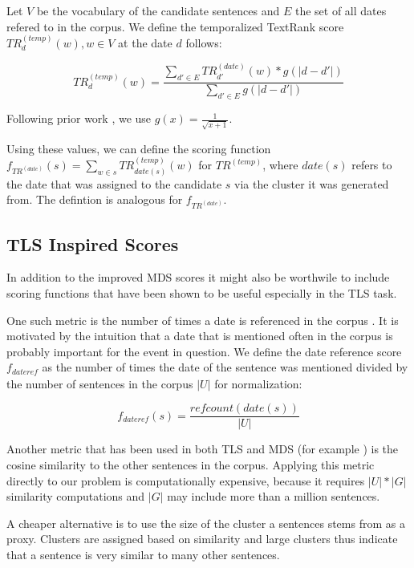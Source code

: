 \documentclass[a4paper,BCOR=10mm]{report}
\numberwithin{lemma}{chapter}
\numberwithin{definition}{chapter}
\begin{document}
Let $V$ be the vocabulary of the candidate sentences and $E$ the set of all dates refered to in the corpus. We define the temporalized TextRank score $TR^{(temp)}_d(w), w \in V$ at the date $d$ follows:

\begin{equation}
    TR^{(temp)}_d(w) = \frac{\sum_{d' \in E} TR^{(date)}_{d'}(w) * g(|d - d'|)}{\sum_{d' \in E} g(|d - d'|)}
\end{equation}

Following prior work \citep{markert}, we use $g(x) = \frac{1}{\sqrt{x + 1}}$.

Using these values, we can define the scoring function $f_{TR^{(date)}}(s) = \sum_{w \in s} TR^{(temp)}_{\mathit{date}(s)}(w)$ for $TR^{(temp)}$, where $\mathit{date}(s)$ refers to the date that was assigned to the candidate $s$ via the cluster it was generated from.
The defintion is analogous for $f_{TR^{(date)}}$.

\subsection{TLS Inspired Scores} \label{sec:tls-scores}

In addition to the improved MDS scores it might also be worthwile to include scoring functions that have been shown to be useful especially in the TLS task.

One such metric is the number of times a date is referenced in the corpus \citep{markert, datesel-graph}. It is motivated by the intuition that a date that is mentioned often in the corpus is probably important for the event in question. We define the date reference score $f_{\mathit{dateref}}$ as the number of times the date of the sentence was mentioned divided by the number of sentences in the corpus $|U|$ for normalization:

\begin{equation}
f_{\mathit{dateref}}(s) = \frac{\mathit{refcount}(\mathit{date}(s))}{|U|}
\end{equation}

Another metric that has been used in both TLS \citep{chieu} and MDS (for example \citet{lexrank}) is the cosine similarity to the other sentences in the corpus.
Applying this metric directly to our problem is computationally expensive, because it requires $|U| * |G|$ similarity computations and $|G|$ may include more than a million sentences.

A cheaper alternative is to use the size of the cluster a sentences stems from as a proxy. Clusters are assigned based on similarity and large clusters thus indicate that a sentence is very similar to many other sentences.
\end{document}
